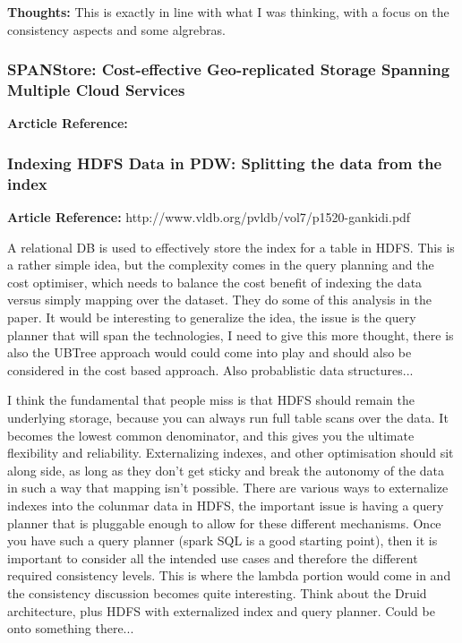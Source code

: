 \documentclass{article}
\begin{document}
\textbf{Thoughts:} This is exactly in line with what I was thinking, with a focus on the consistency aspects and some algrebras.

\subsubsection{SPANStore: Cost-effective Geo-replicated Storage Spanning Multiple Cloud Services}

\textbf{Arcticle Reference:} \cite{Wu:2013:SCG:2517349.2522730}

\subsubsection{Indexing HDFS Data in PDW: Splitting the data from the index}

\textbf{Article Reference:} http://www.vldb.org/pvldb/vol7/p1520-gankidi.pdf

A relational DB is used to effectively store the index for a table in HDFS. This is a rather simple idea, but the complexity comes in the query planning and the cost optimiser, which needs to balance the cost benefit of indexing the data versus simply mapping over the dataset. They do some of this analysis in the paper. It would be interesting to generalize the idea, the issue is the query planner that will span the technologies, I need to give this more thought, there is also the UBTree approach would could come into play and should also be considered in the cost based approach. Also probablistic data structures...

I think the fundamental that people miss is that HDFS should remain the underlying storage, because you can always run full table scans over the data. It becomes the lowest common denominator, and this gives you the ultimate flexibility and reliability. Externalizing indexes, and other optimisation should sit along side, as long as they don't get sticky and break the autonomy of the data in such a way that mapping isn't possible. There are various ways to externalize indexes into the colunmar data in HDFS, the important issue is having a query planner that is pluggable enough to allow for these different mechanisms. Once you have such a query planner (spark SQL is a good starting point), then it is important to consider all the intended use cases and therefore the different required consistency levels. This is where the lambda portion would come in and the consistency discussion becomes quite interesting. Think about the Druid architecture, plus HDFS with externalized index and query planner. Could be onto something there...
\end{document}
